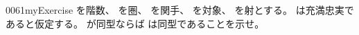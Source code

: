 \documentclass[index]{subfiles}
\begin{document}
\begin{myBlock}{0061}{myExercise}
  を階数、
  を圏、
  を関手、
  を対象、
  を射とする。
  は充満忠実であると仮定する。
  が同型ならば
  は同型であることを示せ。
\end{myBlock}
\end{document}
